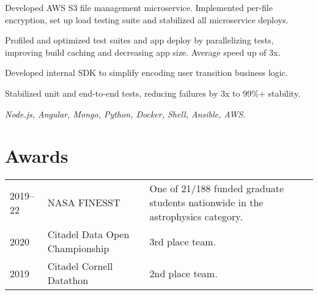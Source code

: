 \documentclass[]{yubo-resume-openfont}
\begin{document}
\begin{minipage}[t]{0.66\textwidth}
\vspace{\topsep} %
\begin{tightemize}
    \item Developed AWS S3 file management microservice. Implemented
        per-file encryption, set up load testing suite and stabilized all
        microservice deploys.
    \item Profiled and optimized test suites and app deploy by parallelizing
        tests, improving build caching and decreasing app size. Average
        speed up of 3x.
    \item Developed internal SDK to simplify encoding user transition
        business logic.
    \item Stabilized unit and end-to-end tests, reducing failures by 3x to
        99\%+ stability.
    \item \emph{Node.js, Angular, Mongo, Python, Docker, Shell, Ansible,
        AWS}.
\end{tightemize}


\section{Awards}
\begin{tabular}{p{50pt}p{80pt}p{7.5cm}}
    2019--22 & NASA FINESST & One of 21/188 funded graduate students nationwide
    in the astrophysics category.\\
    2020 & Citadel Data Open Championship & 3rd place team.\\
    2019 & Citadel Cornell Datathon & 2nd place team.
\end{tabular}

\end{minipage}
\end{document}
